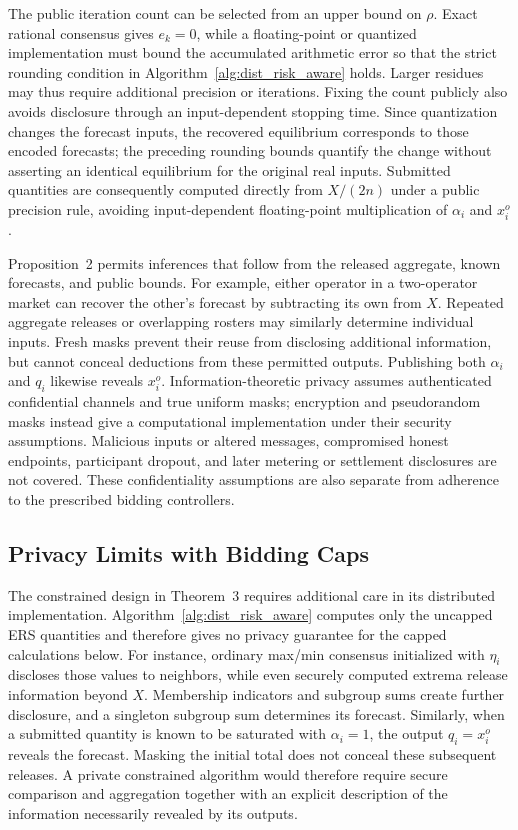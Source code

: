\documentclass[journal]{IEEEtran}
\begin{document}
The public iteration count can be selected from an upper bound on $\rho$. Exact rational consensus gives $e_k=0$, while a floating-point or quantized implementation must bound the accumulated arithmetic error so that the strict rounding condition in Algorithm~\ref{alg:dist_risk_aware} holds. Larger residues may thus require additional precision or iterations. Fixing the count publicly also avoids disclosure through an input-dependent stopping time. Since quantization changes the forecast inputs, the recovered equilibrium corresponds to those encoded forecasts; the preceding rounding bounds quantify the change without asserting an identical equilibrium for the original real inputs. Submitted quantities are consequently computed directly from $X/(2n)$ under a public precision rule, avoiding input-dependent floating-point multiplication of $\alpha_i$ and $x_i^o$.

Proposition~2 permits inferences that follow from the released aggregate, known forecasts, and public bounds. For example, either operator in a two-operator market can recover the other's forecast by subtracting its own from $X$. Repeated aggregate releases or overlapping rosters may similarly determine individual inputs. Fresh masks prevent their reuse from disclosing additional information, but cannot conceal deductions from these permitted outputs. Publishing both $\alpha_i$ and $q_i$ likewise reveals $x_i^o$. Information-theoretic privacy assumes authenticated confidential channels and true uniform masks; encryption and pseudorandom masks instead give a computational implementation under their security assumptions. Malicious inputs or altered messages, compromised honest endpoints, participant dropout, and later metering or settlement disclosures are not covered. These confidentiality assumptions are also separate from adherence to the prescribed bidding controllers.

\subsection{Privacy Limits with Bidding Caps}

The constrained design in Theorem~3 requires additional care in its distributed implementation. Algorithm~\ref{alg:dist_risk_aware} computes only the uncapped ERS quantities and therefore gives no privacy guarantee for the capped calculations below. For instance, ordinary max/min consensus initialized with $\eta_i$ discloses those values to neighbors, while even securely computed extrema release information beyond $X$. Membership indicators and subgroup sums create further disclosure, and a singleton subgroup sum determines its forecast. Similarly, when a submitted quantity is known to be saturated with $\alpha_i=1$, the output $q_i=x_i^o$ reveals the forecast. Masking the initial total does not conceal these subsequent releases. A private constrained algorithm would therefore require secure comparison and aggregation together with an explicit description of the information necessarily revealed by its outputs.
\end{document}
